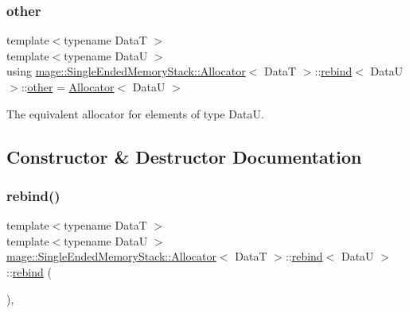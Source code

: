 \subsubsection{\texorpdfstring{other}{other}}
{\footnotesize\ttfamily template$<$typename DataT $>$ \\
template$<$typename DataU $>$ \\
using \hyperlink{structmage_1_1_single_ended_memory_stack_1_1_allocator}{mage\+::\+Single\+Ended\+Memory\+Stack\+::\+Allocator}$<$ DataT $>$\+::\hyperlink{structmage_1_1_single_ended_memory_stack_1_1_allocator_1_1rebind}{rebind}$<$ DataU $>$\+::\hyperlink{structmage_1_1_single_ended_memory_stack_1_1_allocator_1_1rebind_a8046a39ba6854ffa75978d58b0aafa02}{other} =  \hyperlink{structmage_1_1_single_ended_memory_stack_1_1_allocator}{Allocator}$<$ DataU $>$}

The equivalent allocator for elements of type {\ttfamily DataU}. 

\subsection{Constructor \& Destructor Documentation}
\hypertarget{structmage_1_1_single_ended_memory_stack_1_1_allocator_1_1rebind_a4ba91415d43d61d53cd997be987edcbc}{}\label{structmage_1_1_single_ended_memory_stack_1_1_allocator_1_1rebind_a4ba91415d43d61d53cd997be987edcbc} 
\subsubsection{\texorpdfstring{rebind()}{rebind()}\hspace{0.1cm}{\footnotesize\ttfamily [1/3]}}
{\footnotesize\ttfamily template$<$typename DataT $>$ \\
template$<$typename DataU $>$ \\
\hyperlink{structmage_1_1_single_ended_memory_stack_1_1_allocator}{mage\+::\+Single\+Ended\+Memory\+Stack\+::\+Allocator}$<$ DataT $>$\+::\hyperlink{structmage_1_1_single_ended_memory_stack_1_1_allocator_1_1rebind}{rebind}$<$ DataU $>$\+::\hyperlink{structmage_1_1_single_ended_memory_stack_1_1_allocator_1_1rebind}{rebind} (\begin{DoxyParamCaption}{ }\end{DoxyParamCaption})\hspace{0.3cm}{\ttfamily [private]}, {\ttfamily [delete]}}

